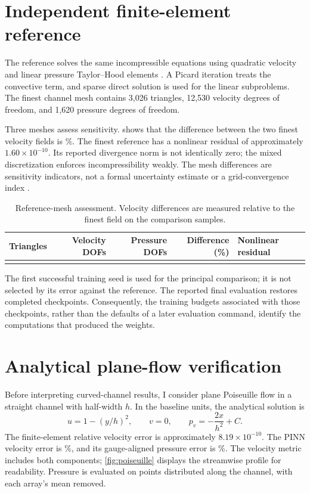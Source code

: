 \section{Independent finite-element reference}
The reference solves the same incompressible equations using quadratic
velocity and linear pressure Taylor--Hood elements
\citep{taylor1973,gustafsson2020}. A Picard iteration treats the convective
term, and sparse direct solution is used for the linear subproblems.
The finest channel mesh contains 3,026 triangles, 12,530 velocity degrees
of freedom, and 1,620 pressure degrees of freedom.

Three meshes assess sensitivity.  shows that the difference
between the two finest velocity fields is \MeshDifference\%. The finest
reference has a nonlinear residual of approximately
$1.60\times10^{-10}$. Its reported divergence norm is not identically zero;
the mixed discretization enforces incompressibility weakly. The mesh
differences are sensitivity indicators, not a formal uncertainty estimate
or a grid-convergence index \citep{roache1998,celik2008}. %

\begin{table}[htbp]\centering\small
\caption{Reference-mesh assessment. Velocity differences are measured
relative to the finest field on the comparison samples.}
\label{tab:mesh}
\begin{tabularx}{\textwidth}{@{}rrrrY@{}}\toprule
Triangles & Velocity DOFs & Pressure DOFs & Difference (\%) & Nonlinear residual\\\midrule
{}
\bottomrule\end{tabularx}
\end{table}

The first successful training seed is used for the principal comparison;
it is not selected by its error against the reference. The reported final
evaluation restores completed checkpoints. Consequently, the training
budgets associated with those checkpoints, rather than the defaults of a
later evaluation command, identify the computations that produced the
weights.

\section{Analytical plane-flow verification}
Before interpreting curved-channel results, I consider plane Poiseuille
flow in a straight channel with half-width $h$. In the baseline units, the
analytical solution is
\begin{equation}
 u=1-(y/h)^2,\qquad v=0,\qquad
 p_v=-\frac{2x}{h^2}+C.
 \label{eq:poiseuille}
\end{equation}
The finite-element relative velocity error is approximately
$8.19\times10^{-10}$. The PINN velocity error is
\PoiseuilleVelocity\%, and its gauge-aligned pressure error is
\PoiseuillePressure\%. The velocity metric includes both components;
\cref{fig:poiseuille} displays the streamwise profile for readability.
Pressure is evaluated on points distributed along the channel, with each
array's mean removed.

